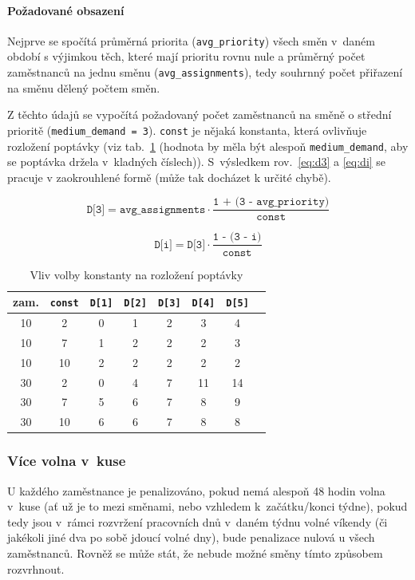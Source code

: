 \documentclass[twoside]{ctuthesis}
\begin{document}
\begin{enumerate}[label=\textbf{O\arabic*.}]
\paragraph{Požadované obsazení}
Nejprve se spočítá průměrná priorita (\texttt{avg\_priority}) všech směn v~daném období s výjimkou těch, které mají prioritu rovnu nule a průměrný počet zaměstnanců na jednu směnu (\texttt{avg\_assignments}), tedy souhrnný počet přiřazení na směnu dělený počtem směn.

Z těchto údajů se vypočítá požadovaný počet zaměstnanců na směně o střední prioritě (\texttt{medium\_demand = 3}). \texttt{const} je nějaká konstanta, která ovlivňuje rozložení poptávky (viz tab.~\ref{tab:demandfactor} (hodnota by měla být alespoň \texttt{medium\_demand}, aby se poptávka držela v~kladných číslech)). S~výsledkem rov.~\ref{eq:d3} a \ref{eq:di} se pracuje v zaokrouhlené formě (může tak docházet k určité chybě).

\begin{equation}
	\label{eq:d3}
	\texttt{D[3]} = \texttt{avg\_assignments} \cdot \frac{\texttt{1 + (3 - avg\_priority})}{\texttt{const}}
\end{equation}

\begin{equation}
	\label{eq:di}
	\texttt{D[i]} = \texttt{D[3]} \cdot \frac{\texttt{1 - (3 - i})}{\texttt{const}}
\end{equation}

\begin{table}[h]
	\caption{Vliv volby konstanty na rozložení poptávky}
	\label{tab:demandfactor}
	\begin{tabular}{|c|c|c|c|c|c|c|c|}
		\hline
		zam. & \texttt{const} & \texttt{D[1]} & \texttt{D[2]} & \texttt{D[3]} & \texttt{D[4]} & \texttt{D[5]} \\
		\hline
		10 & 2 & 0 & 1 & 2 & 3 & 4 \\
		10 & 7 & 1 & 2 & 2 & 2 & 3 \\
		10 & 10 & 2 & 2 & 2 & 2 & 2 \\
		30 & 2 & 0 & 4 & 7 & 11 & 14 \\
		30 & 7 & 5 & 6 & 7 & 8 & 9 \\
		30 & 10 & 6 & 6 & 7 & 8 & 8 \\
		\hline
	\end{tabular}
\end{table}

\subsubsection{Více volna v~kuse}
U každého zaměstnance je penalizováno, pokud nemá alespoň 48 hodin volna v~kuse (ať už je to mezi směnami, nebo vzhledem k~začátku/konci týdne), pokud tedy jsou v~rámci rozvržení pracovních dnů v~daném týdnu volné víkendy (či jakékoli jiné dva po sobě jdoucí volné dny), bude penalizace nulová u všech zaměstnanců. Rovněž se může stát, že nebude možné směny tímto způsobem rozvrhnout.


\end{enumerate}
\end{document}
